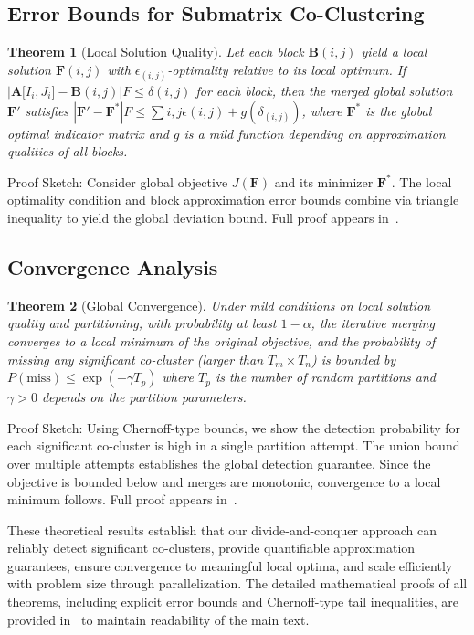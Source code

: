 \documentclass[journal]{IEEEtran}
\newtheorem{theorem}{Theorem}
\begin{document}
\subsection{Error Bounds for Submatrix Co-Clustering}
\begin{theorem}[Local Solution Quality]
    Let each block $\mathbf{B}{(i,j)}$ yield a local solution $\mathbf{F}{(i,j)}$ with $\epsilon_{(i,j)}$-optimality relative to its local optimum. If $|\mathbf{A}\lbrack I_i,J_i\rbrack - \mathbf{B}{(i,j)}|F \le \delta{(i,j)}$ for each block, then the merged global solution $\mathbf{F}'$ satisfies $|\mathbf{F}' - \mathbf{F}^*|F \le \sum{i,j} \epsilon{(i,j)} + g({\delta_{(i,j)}})$, where $\mathbf{F}^*$ is the global optimal indicator matrix and $g$ is a mild function depending on approximation qualities of all blocks.
\end{theorem}
Proof Sketch: Consider global objective $J(\mathbf{F})$ and its minimizer $\mathbf{F}^*$. The local optimality condition and block approximation error bounds combine via triangle inequality to yield the global deviation bound. Full proof appears in~.

\subsection{Convergence Analysis}
\begin{theorem}[Global Convergence]
    Under mild conditions on local solution quality and partitioning, with probability at least $1-\alpha$, the iterative merging converges to a local minimum of the original objective, and the probability of missing any significant co-cluster (larger than $T_m \times T_n$) is bounded by $P(\text{miss}) \le \exp(-\gamma T_p)$ where $T_p$ is the number of random partitions and $\gamma > 0$ depends on the partition parameters.
\end{theorem}
Proof Sketch: Using Chernoff-type bounds, we show the detection probability for each significant co-cluster is high in a single partition attempt. The union bound over multiple attempts establishes the global detection guarantee. Since the objective is bounded below and merges are monotonic, convergence to a local minimum follows. Full proof appears in~.

These theoretical results establish that our divide-and-conquer approach can reliably detect significant co-clusters, provide quantifiable approximation guarantees, ensure convergence to meaningful local optima, and scale efficiently with problem size through parallelization. The detailed mathematical proofs of all theorems, including explicit error bounds and Chernoff-type tail inequalities, are provided in~ to maintain readability of the main text.
\end{document}
